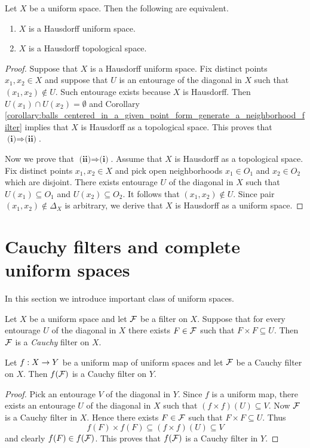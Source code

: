 \begin{fact}\label{fact:Hausdorff_uniform_space_is_Hausdorff_as_a_topological_space}
	Let $X$ be a uniform space. Then the following are equivalent.
	\begin{enumerate}[label=\emph{\textbf{(\arabic*)}}, leftmargin=3.0em]
		\item $X$ is a Hausdorff uniform space.
		\item $X$ is a Hausdorff topological space.
	\end{enumerate}
\end{fact}
\begin{proof}
	Suppose that $X$ is a Hausdorff uniform space. Fix distinct points $x_1,x_2 \in X$ and suppose that $U$ is an entourage of the diagonal in $X$ such that $(x_1,x_2) \not \in U$. Such entourage exists because $X$ is Hausdorff. Then $U(x_1)\cap U(x_2) = \emptyset$ and Corollary \ref{corollary:balls_centered_in_a_given_point_form_generate_a_neighborhood_filter} implies that $X$ is Hausdorff as a topological space. This proves that $\textbf{(i)}\Rightarrow \textbf{(ii)}$.

	Now we prove that $\textbf{(ii)}\Rightarrow \textbf{(i)}$. Assume that $X$ is Hausdorff as a topological space. Fix distinct points $x_1,x_2 \in X$ and pick open neighborhoods $x_1 \in O_1$ and $x_2 \in O_2$ which are disjoint. There exists entourage $U$ of the diagonal in $X$ such that $U(x_1) \subseteq O_1$ and $U(x_2) \subseteq O_2$. It follows that $(x_1,x_2) \not \in U$. Since pair $(x_1,x_2) \not \in \Delta_X$ is arbitrary, we derive that $X$ is Hausdorff as a uniform space.
\end{proof}

\section{Cauchy filters and complete uniform spaces}
\noindent
In this section we introduce important class of uniform spaces.

\begin{definition}
	Let $X$ be a uniform space and let ${\mathcal F}$ be a filter on $X$. Suppose that for every entourage $U$ of the diagonal in $X$ there exists $F \in {\mathcal F}$ such that $F\times F \subseteq U$. Then ${\mathcal F}$ is a \textit{Cauchy} filter on $X$.
\end{definition}

\begin{fact}\label{fact:Cauchy_filters_are_preserved_by_uniform_maps}
	Let $f:X\rightarrow Y$ be a uniform map of uniform spaces and let ${\mathcal F}$ be a Cauchy filter on $X$. Then $f({\mathcal F})$ is a Cauchy filter on $Y$.
\end{fact}
\begin{proof}
	Pick an entourage $V$ of the diagonal in $Y$. Since $f$ is a uniform map, there exists an entourage $U$ of the diagonal in $X$ such that $\left(f\times f\right)(U) \subseteq V$. Now ${\mathcal F}$ is a Cauchy filter in $X$. Hence there exists $F \in {\mathcal F}$ such that $F\times F \subseteq U$. Thus
	$$f(F)\times f(F) \subseteq \left(f\times f\right)(U) \subseteq V$$
	and clearly $f(F) \in f({\mathcal F})$. This proves that $f({\mathcal F})$ is a Cauchy filter in $Y$.
\end{proof}

